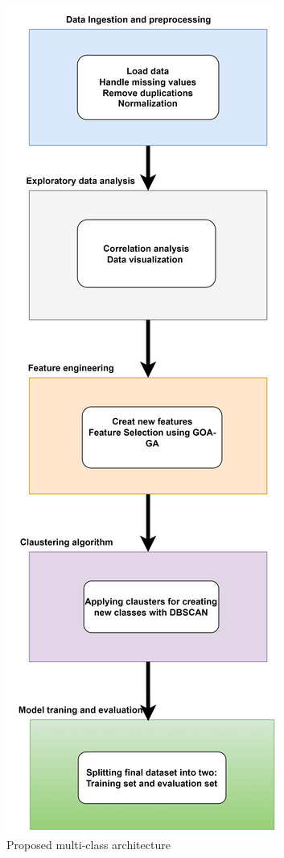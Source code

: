 \newpage
\newpage

\vfill

\begin{figure}[ht]
    \centering
    \includegraphics[width=0.5\linewidth]{chap3/images/architecture of multiclass2.drawio.png}
    \caption{Proposed multi-class architecture}
    \label{fig:ent-label}
\end{figure}

